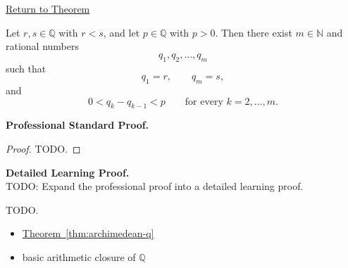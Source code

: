 \newpage
{}
\label{prf:rational-chain-with-small-steps}

\begin{remark*}[Return]
\hyperref[thm:rational-chain-with-small-steps]{Return to Theorem}
\end{remark*}

\begin{theorem*}
Let $r,s\in\mathbb{Q}$ with $r<s$, and let $p\in\mathbb{Q}$ with $p>0$.
Then there exist $m\in\mathbb{N}$ and rational numbers
\[
q_1,q_2,\dots,q_m
\]
such that
\[
q_1=r,
\qquad
q_m=s,
\]
and
\[
0<q_k-q_{k-1}<p
\qquad
\text{for every }k=2,\dots,m.
\]
\end{theorem*}

\textbf{Professional Standard Proof.}~\\
\begin{proof}
TODO.
\end{proof}

\textbf{Detailed Learning Proof.}~\\
TODO: Expand the professional proof into a detailed learning proof.


\begin{remark*}
TODO.
\end{remark*}

\begin{dependencies}
\begin{itemize}
  \item \hyperref[thm:archimedean-q]{Theorem~\ref*{thm:archimedean-q}}
  \item basic arithmetic closure of $\mathbb{Q}$
\end{itemize}
\end{dependencies}
